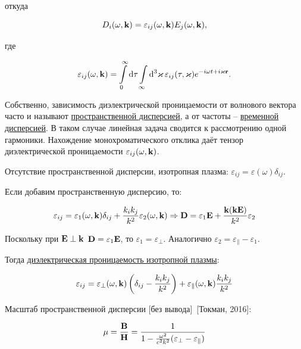 \documentclass[10pt, a4paper]{article}
\newcommand{\Tokman}{~[Токман, 2016]}
\begin{document}
откуда

\begin{equation*}
	D_i(\omega, \vb{k}) = \varepsilon_{ij} (\omega, \vb{k}) E_j(\omega, \vb{k}),
\end{equation*}

где

\begin{equation*}
	\varepsilon_{ij} (\omega, \vb{k}) = \int\limits_0^\infty \dd{\tau}\int\limits_\infty\dd[3]{\varkappa}\varepsilon_{ij}(\tau,\vb{\varkappa})e^{-i\omega t+ i\vb{\varkappa}\vb{r}}.
\end{equation*}

Собственно, зависимость диэлектрической проницаемости от волнового вектора часто и называют \uline{пространственной дисперсией}, а от частоты -- \uline{временной дисперсией}. В таком случае линейная задача сводится к рассмотрению одной гармоники. Нахождение монохроматического отклика даёт тензор диэлектрической проницаемости $\varepsilon_{ij} (\omega, \vb{k})$.

Отсутствие пространственной дисперсии, изотропная плазма: $\varepsilon_{ij} = \varepsilon(\omega)\delta_{ij}$. 

Если добавим пространственную дисперсию, то:

\begin{equation*}
	\varepsilon_{ij} = \varepsilon_1 (\omega, \vb{k})\delta_{ij}+\frac{k_ik_j}{k^2}\varepsilon_2(\omega, \vb{k}) \Rightarrow \vb{D} = \varepsilon_1\vb{E}+\frac{\vb{k}(\vb{k}\vb{E})}{k^2}\varepsilon_2
\end{equation*}

Поскольку при $\vb{E}\perp\vb{k}$ $\vb{D} = \varepsilon_1\vb{E}$, то $\varepsilon_1=\varepsilon_{\perp}$. Аналогично $\varepsilon_2 = \varepsilon_{\parallel}-\varepsilon_1$.

Тогда \uline{диэлектрическая проницаемость изотропной плазмы}:

\begin{equation*}
	\varepsilon_{ij} = \varepsilon_\perp (\omega, \vb{k})\left( \delta_{ij}-\frac{k_ik_j}{k^2}\right) + \varepsilon_\parallel(\omega, \vb{k})\frac{k_ik_j}{k^2}
\end{equation*}

Масштаб пространственной дисперсии [без вывода]\Tokman:

\begin{equation*}
	\mu = \frac{\vb{B}}{\vb{H}} = \frac{1}{1-\frac{\omega^2}{c^2k^2}(\varepsilon_\perp-\varepsilon_\parallel)}
\end{equation*}
\end{document}
